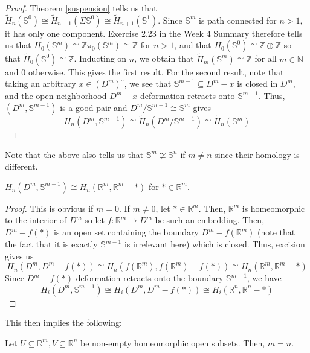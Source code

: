 \documentclass[12pt,reqno]{amsart}
\numberwithin{theorem}{section}
\theoremstyle{definition}
\theoremstyle{remark}
\numberwithin{equation}{section}
\newcommand{\Z}{\mathbb Z}
\newcommand{\N}{\mathbb N}
\renewcommand{\S}{\mathbb S}
\theoremstyle{definition}
\newcommand{\R}{\mathbb{R}}
\begin{document}
\begin{proof}
    Theorem \ref{suspension} tells us that $\tilde H_n(\S^0) \cong \tilde H_{n+1}(\Sigma \S^0) \cong \tilde H_{n+1}(\S^1)$. Since $\S^m$ is path connected for $n > 1$, it has only one component. Exercise 2.23 in the Week 4 Summary therefore tells us that $H_0(\S^m) \cong \Z\pi_0(\S^m) \cong \Z$ for $n > 1$, and that $H_0(\S^0) \cong \Z\oplus \Z$ so that $\tilde H_0(\S^0) \cong \Z$. Inducting on $n$, we obtain that $\tilde H_m(\S^m) \cong \Z$  for all $m \in \N$ and 0 otherwise. This gives the first result. For the second result, note that taking an arbitrary $x \in (D^m)^\circ$, we see that $\S^{m-1}\subseteq D^m-x$ is closed in $D^m$, and the open neighborhood $D^m-x$ deformation retracts onto $\S^{m-1}$. Thus, $(D^m,\S^{m-1})$ is a good pair and $D^m/\S^{m-1} \cong \S^m$ gives $$H_n(D^m,\S^{m-1}) \cong \tilde H_n(D^m/\S^{m-1}) \cong \tilde H_n(\S^m)$$
\end{proof}
Note that the above also tells us that $\S^m \not \cong \S^n$ if $m \neq n$ since their homology is different.
\begin{corollary}
    $H_n(D^m,\S^{m-1})  \cong H_n(\R^m,\R^m-*)$ for $* \in \R^m$.
\end{corollary}
\begin{proof}
    This is obvious if $m= 0$. If $m\neq 0$, let $* \in \R^m$. Then, $\R^m$ is homeomorphic to the interior of $D^m$ so let $f:\R^m \rightarrow D^m$ be such an embedding. Then, $D^m-f(*)$ is an open set containing the boundary $D^m-f(\R^m)$ (note that the fact that it is exactly $\S^{m-1}$ is irrelevant here) which is closed. Thus, excision gives us $$H_n(D^m,D^m-f(*)) \cong H_n(f(\R^m),f(\R^m)-f(*)) \cong H_n(\R^m,\R^m-*)$$
    Since $D^m-f(*)$ deformation retracts onto the boundary $\S^{m-1}$, we have
    $$H_i(D^m,\S^{m-1}) \cong H_i(D^m,D^m-f(*)) \cong H_i(\R^n,\R^n-*)$$
\end{proof}
This then implies the following:
\begin{theorem}
     Let $U\subseteq \R^m, V\subseteq \R^n$ be non-empty homeomorphic open subsets. Then, $m=n$.
\end{theorem}
\end{document}
